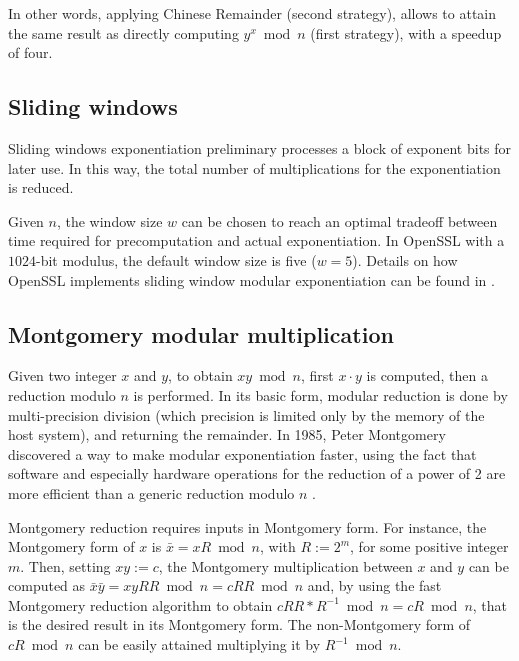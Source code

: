 In other words, applying Chinese Remainder (second strategy), allows to attain the same result as directly computing $y^x \bmod n$ (first strategy), with a speedup of four.

\subsection{Sliding windows}

Sliding windows exponentiation preliminary processes a block of exponent bits for later use. In this way, the total number of multiplications for the exponentiation is reduced.

Given $n$, the window size $w$ can be chosen to reach an optimal tradeoff between time required for precomputation and actual exponentiation. In OpenSSL with a $1024$-bit modulus, the default window size is five ($w = 5$). Details on how OpenSSL implements sliding window modular exponentiation can be found in \cite{bib:sliding}.

\subsection{Montgomery modular multiplication}\label{subsec:montgomery}
Given two integer $x$ and $y$, to obtain $xy \bmod n$, first $x \cdot y$ is computed, then a reduction modulo $n$ is performed.
In its basic form, modular reduction is done by multi-precision division (which precision is limited only by the memory of the host system), and returning the remainder.
In 1985, Peter Montgomery discovered a way to make modular exponentiation faster, using the fact that software and especially hardware operations for the reduction of a power of 2 are more efficient than a generic reduction modulo $n$ \cite{bib:montgomery}.

Montgomery reduction requires inputs in Montgomery form. For instance, the Montgomery form of $x$ is $\bar{x} = xR \bmod n$, with $R := 2^m$, for some positive integer $m$. Then, setting $xy := c$, the Montgomery multiplication between $x$ and $y$ can be computed as $\bar{x} \bar{y} =  xyRR \bmod n = cRR \bmod n$ and, by using the fast Montgomery reduction algorithm to obtain $cRR * R^{-1} \bmod n = cR \bmod n$, that is the desired result in its Montgomery form. The non-Montgomery form of $cR \bmod n$ can be easily attained multiplying it by $R^{-1} \bmod n$.

